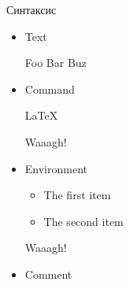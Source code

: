 \begin{frame}[fragile]{Синтаксис}
  \begin{itemize}
    \item Text
      \begin{latexcode}
        Foo Bar Buz
      \end{latexcode}
    \pause  
    \item Command
      \begin{latexcode}
        \LaTeX
        \date{\today}
        \Large Waaagh!
      \end{latexcode}
    \pause  
    \item Environment
      \begin{latexcode}
        \begin{itemize}
          \item The first item
          \item The second item
        \end{itemize}
        {\Large Waaagh!}
      \end{latexcode}
    \pause  
    \item Comment
      \begin{latexcode}
      \end{latexcode}
  \end{itemize}
\end{frame}
